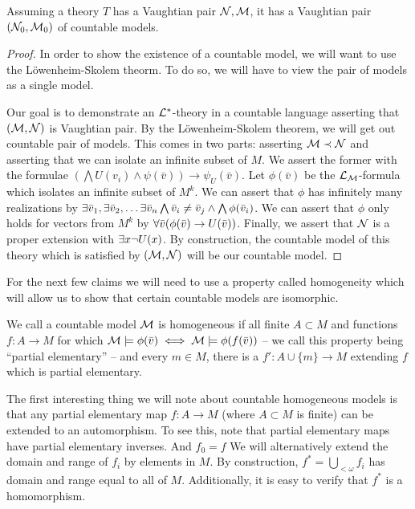 \begin{theorem}\label{thm_countable_vaughtian_pairs}
Assuming a theory \(T\) has a Vaughtian pair \(\mathcal{N}, \mathcal{M}\), it has a Vaughtian pair \((\mathcal{N}_0, \mathcal{M}_0)\) of countable models. 
\end{theorem}

\begin{proof}\label{proof_countable_vaughtian_pairs}
In order to show the existence of a countable model, we will want to use the L\"owenheim-Skolem theorm.
To do so, we will have to view the pair of models as a single model. 

Our goal is to demonstrate an \(\mathcal{L}^*\)-theory in a countable language asserting that \((\mathcal{M}, \mathcal{N})\) is Vaughtian pair.
By the L\"owenheim-Skolem theorem, we will get out countable pair of models.
This comes in two parts: asserting \(\mathcal{M} \prec \mathcal{N}\) and asserting that we can isolate an infinite subset of \(M\). 
We assert the former with the formulae \((\bigwedge U(v_i) \land \psi(\bar{v})) \to \psi_U(\bar{v})\). 
Let \(\phi(\bar{v})\) be the \(\mathcal{L}_{\mathcal{M}}\)-formula which isolates an infinite subset of \(M^k\). 
We can assert that \(\phi\) has infinitely many realizations by \(\exists \bar{v}_1, \exists \bar{v}_2, \ldots \exists \bar{v}_n \bigwedge \bar{v}_i \neq \bar{v}_j \land \bigwedge \phi(\bar{v}_i)\). %
We can assert that \(\phi\) only holds for vectors from \(M^k\) by \(\forall \bar{v} (\phi(\bar{v}) \to U(\bar{v}))\).
Finally, we assert that \(\mathcal{N}\) is a proper extension with \(\exists x \neg U(x)\). 
By construction, the countable model of this theory which is satisfied by \((\mathcal{M}, \mathcal{N})\) will be our countable model.
\end{proof}

For the next few claims we will need to use a property called homogeneity which will allow us to show that certain countable models are isomorphic.

\begin{definition}\label{definition_homogeneity}
We call a countable model \(\mathcal{M}\) is homogeneous if all finite \(A \subset M\) and functions \(f: A \to M\) for which \(\mathcal{M} \models \phi(\bar{v}) \iff \mathcal{M} \models \phi(f(\bar{v}))\) -- we call this property being ``partial elementary'' -- and every \(m \in M\), there is a \(f': A \cup \{m\} \to M\) extending \(f\) which is partial elementary. %
\end{definition}

The first interesting thing we will note about countable homogeneous models is that any partial elementary map \(f: A \to M\) (where \(A \subset M\) is finite) can be extended to an automorphism. 
To see this, note that partial elementary maps have partial elementary inverses. And \(f_0 = f\) %
We will alternatively extend the domain and range of \(f_i\) by elements in \(M\). 
By construction, \(f^* = \bigcup_{<\omega}f_i\) has domain and range equal to all of \(M\). %
Additionally, it is easy to verify that \(f^*\) is a homomorphism. 

